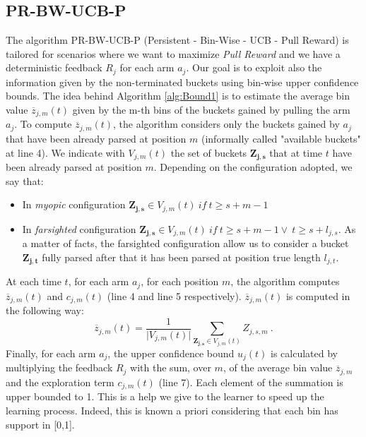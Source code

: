 \subsection{PR-BW-UCB-P}
The algorithm PR-BW-UCB-P (Persistent - Bin-Wise - UCB - Pull Reward)  is tailored for scenarios where we want to maximize \emph{Pull Reward} and we have a deterministic feedback $R_j$ for each arm $a_j$. Our goal is to exploit also the information given by the non-terminated buckets using bin-wise upper confidence bounds. The idea behind Algorithm \ref{alg:Bound1} is to estimate the average bin value $\overline{z}_{j,m}(t)$ given by the m-th bins of the buckets gained by pulling the arm $a_j$. To compute $\overline{z}_{j,m}(t)$, the algorithm considers only the buckets gained by $a_j$ that have been already parsed at position $m$ (informally called "available buckets" at line 4). We indicate with $V_{j,m}(t)$ the set of buckets $\boldsymbol{Z_{j,s}}$ that at time $t$ have been already parsed at position $m$. Depending on the configuration adopted, we say that:
\begin{itemize}
	\item In \emph{myopic} configuration  $\boldsymbol{Z_{j,s}} \in V_{j,m}(t) \ if \ t\geq s+m-1$
	\item In \emph{farsighted} configuration  $\boldsymbol{Z_{j,s}} \in V_{j,m}(t) \ if \ t\geq s+m-1 \vee \ t \geq s+l_{j,s} $. As a matter of facts, the farsighted configuration allow us to consider a bucket $\boldsymbol{Z_{j,t}}$ fully parsed after that it has been parsed at position true length $l_{j,t}$. 
\end{itemize}


At each time $t$, for each arm $a_j$, for each position $m$, the algorithm computes $\overline{z}_{j,m}(t)$ and $c_{j,m}(t)$ (line 4 and line 5 respectively). $\overline{z}_{j,m}(t)$ is computed in the following way: $$\overline{z}_{j,m}(t) = \frac{1}{\vert V_{j,m}(t) \vert} \sum_{\boldsymbol{Z_{j,s}} \in V_{j,m}(t)} Z_{j,s,m}\ .$$
Finally, for each arm $a_j$, the upper confidence bound $u_j(t)$ is calculated by multiplying the feedback $R_j$  with the sum, over $m$, of the average bin value $\overline{z}_{j,m}$ and the exploration term  $c_{j,m}(t)$  (line 7). Each element of the summation is upper bounded to 1. This is a help we give to the learner to speed up the learning process. Indeed, this is known a priori considering that each bin has support in [0,1]. 









